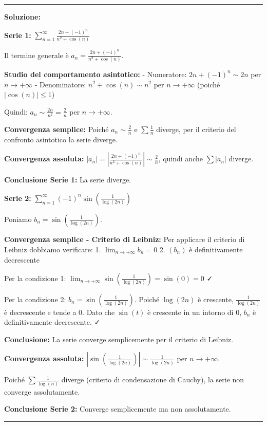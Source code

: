 \documentclass[12pt, a4paper]{article}
\newenvironment{solution}
{\par\noindent\rule{\textwidth}{0.4pt}\par\textbf{Soluzione:}\medskip\par}
{\par\rule{\textwidth}{0.4pt}\par\bigskip}
\begin{document}
\begin{solution}
\textbf{Serie 1:} $\displaystyle\sum_{n=1}^{\infty} \frac{2n+(-1)^{n}}{n^{2}+\cos(n)}$

Il termine generale è $a_n = \frac{2n+(-1)^{n}}{n^{2}+\cos(n)}$.

\textbf{Studio del comportamento asintotico:}
- Numeratore: $2n+(-1)^{n} \sim 2n$ per $n \to +\infty$
- Denominatore: $n^{2}+\cos(n) \sim n^2$ per $n \to +\infty$ (poiché $|\cos(n)| \leq 1$)

Quindi: $a_n \sim \frac{2n}{n^2} = \frac{2}{n}$ per $n \to +\infty$.

\textbf{Convergenza semplice:}
Poiché $a_n \sim \frac{2}{n}$ e $\sum \frac{1}{n}$ diverge, per il criterio del confronto asintotico la serie diverge.

\textbf{Convergenza assoluta:}
$|a_n| = \left|\frac{2n+(-1)^{n}}{n^{2}+\cos(n)}\right| \sim \frac{2}{n}$, quindi anche $\sum |a_n|$ diverge.

\textbf{Conclusione Serie 1:} La serie diverge.

\vspace{0.5cm}

\textbf{Serie 2:} $\displaystyle\sum_{n=1}^{\infty} (-1)^{n} \sin\left(\frac{1}{\log(2n)}\right)$

Poniamo $b_n = \sin\left(\frac{1}{\log(2n)}\right)$.

\textbf{Convergenza semplice - Criterio di Leibniz:}
Per applicare il criterio di Leibniz dobbiamo verificare:
1. $\lim_{n \to +\infty} b_n = 0$
2. $(b_n)$ è definitivamente decrescente

Per la condizione 1:
$\lim_{n \to +\infty} \sin\left(\frac{1}{\log(2n)}\right) = \sin(0) = 0$ ✓

Per la condizione 2:
$b_n = \sin\left(\frac{1}{\log(2n)}\right)$. Poiché $\log(2n)$ è crescente, $\frac{1}{\log(2n)}$ è decrescente e tende a 0. 
Dato che $\sin(t)$ è crescente in un intorno di 0, $b_n$ è definitivamente decrescente. ✓

\textbf{Conclusione:} La serie converge semplicemente per il criterio di Leibniz.

\textbf{Convergenza assoluta:}
$\left|\sin\left(\frac{1}{\log(2n)}\right)\right| \sim \frac{1}{\log(2n)}$ per $n \to +\infty$.

Poiché $\sum \frac{1}{\log(n)}$ diverge (criterio di condensazione di Cauchy), la serie non converge assolutamente.

\textbf{Conclusione Serie 2:} Converge semplicemente ma non assolutamente.


\end{solution}
\end{document}
